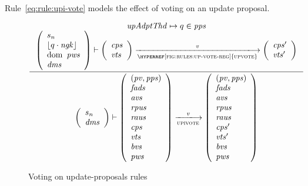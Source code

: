\clearpage

Rule~\ref{eq:rule:upi-vote} models the effect of voting on an update proposal.

\begin{figure}[htb]
  \begin{equation}
    \label{eq:rule:upi-vote}
    \inference
    {
      \var{upAdptThd} \mapsto q \in \var{pps}\\
      {\left(
        \begin{array}{l}
          s_n\\
          \floor{q \cdot \var{ngk}}\\
          \var{\dom~pws}\\
          \var{dms}
        \end{array}
      \right)}
      \vdash
      {
        \left(
          \begin{array}{l}
            \var{cps}\\
            \var{vts}
          \end{array}
        \right)
      }
      \trans{\hyperref[fig:rules:up-vote-reg]{upvote}}{\var{v}}
      {
        \left(
          \begin{array}{l}
            \var{cps'}\\
            \var{vts'}
          \end{array}
        \right)
      }
    }
    {
      {\left(
        \begin{array}{l}
          s_n\\
          \var{dms}
        \end{array}
      \right)}
      \vdash
      {
        \left(
          \begin{array}{l}
            (\var{pv}, \var{pps})\\
            \var{fads}\\
            \var{avs}\\
            \var{rpus}\\
            \var{raus}\\
            \var{cps}\\
            \var{vts}\\
            \var{bvs}\\
            \var{pws}
          \end{array}
        \right)
      }
      \trans{upivote}{\var{v}}
      {
        \left(
          \begin{array}{l}
            (\var{pv}, \var{pps})\\
            \var{fads}\\
            \var{avs}\\
            \var{rpus}\\
            \var{raus}\\
            \var{cps'}\\
            \var{vts'}\\
            \var{bvs}\\
            \var{pws}
          \end{array}
        \right)
      }
    }
  \end{equation}
  \caption{Voting on update-proposals rules}
  \label{fig:rules:upi-vote}
\end{figure}

